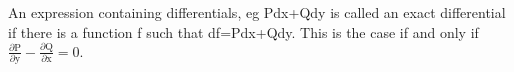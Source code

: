 An expression containing differentials, eg Pdx+Qdy is called an
exact differential if there is a function f such that df=Pdx+Qdy.
This is the case if and only if $ \frac{\partial \mathrm{P}}{\partial \mathrm{y}}
- \frac{\partial \mathrm{Q}}{\partial \mathrm{x}} = 0 . $